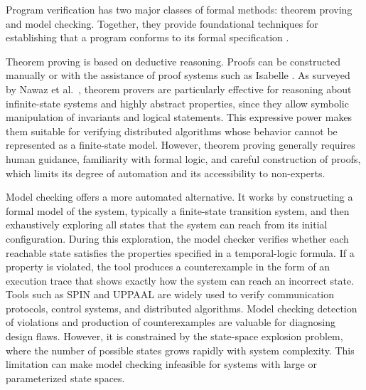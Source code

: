 Program verification has two major classes of formal methods: theorem proving and model checking. Together, they provide foundational techniques for establishing that a program conforms to its formal specification \cite{clarke1999modelchecking, clarke2018handbook}. 

Theorem proving is based on deductive reasoning. Proofs can be constructed manually or with the assistance of proof systems such as Isabelle \cite{paulson1989isabelle}. As surveyed by Nawaz et al.\ \cite{nawaz2019survey}, theorem provers are particularly effective for reasoning about infinite-state systems and highly abstract properties, since they allow symbolic manipulation of invariants and logical statements. This expressive power makes them suitable for verifying distributed algorithms whose behavior cannot be represented as a finite-state model. However, theorem proving generally requires human guidance, familiarity with formal logic, and careful construction of proofs, which limits its degree of automation and its accessibility to non-experts.

Model checking offers a more automated alternative. It works by constructing a formal model of the system, typically a finite-state transition system, and then exhaustively exploring all states that the system can reach from its initial configuration. During this exploration, the model checker verifies whether each reachable state satisfies the properties specified in a temporal-logic formula. If a property is violated, the tool produces a counterexample in the form of an execution trace that shows exactly how the system can reach an incorrect state. Tools such as SPIN \cite{holzmann1997spin} and UPPAAL \cite{bozga2009verifying} are widely used to verify communication protocols, control systems, and distributed algorithms. Model checking detection of violations and production of counterexamples are valuable for diagnosing design flaws. However, it is constrained by the state-space explosion problem, where the number of possible states grows rapidly with system complexity. This limitation can make model checking infeasible for systems with large or parameterized state spaces.

